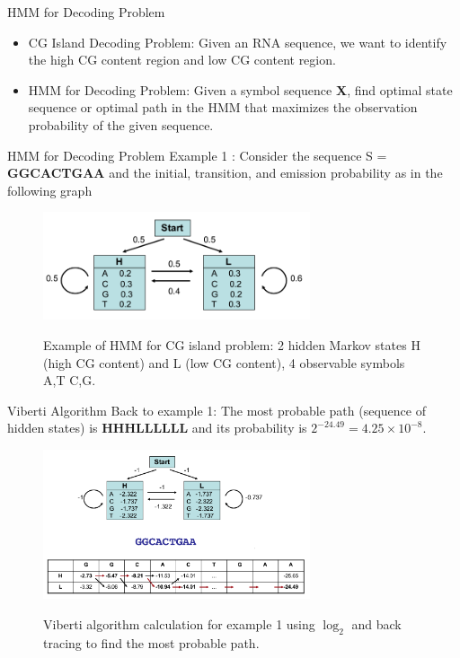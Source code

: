 \documentclass{beamer}
\begin{document}
\begin{frame}{HMM for Decoding Problem}
	\begin{itemize}
		\item CG Island Decoding Problem: Given an RNA sequence, we want to identify the high CG content region and low CG content region.
		\item HMM for Decoding Problem: Given a symbol sequence \textbf{X}, find optimal state sequence or optimal path in the HMM that maximizes the observation probability of the given sequence.
	\end{itemize}
\end{frame}

\begin{frame}{HMM for Decoding Problem}
	Example 1 \cite{borodovsky2006problems}: Consider the sequence S = \textbf{GGCACTGAA} and the initial, transition, and emission probability as in the following graph
	\begin{figure}
		\centering
		\includegraphics[width = 0.7\textwidth]{example1.png}
		\label{fig:example1}
		\caption{Example of HMM for CG island problem: 2 hidden Markov states H (high CG content) and L (low CG content), 4 observable symbols A,T C,G.}
	\end{figure}
\end{frame} 

\begin{frame}{Viberti Algorithm}
	Back to example 1: The most probable path (sequence of hidden states) is \textbf{HHHLLLLLL} and its probability is $2^{-24.49} = 4.25 \times 10^{-8}$.
	\begin{figure}
		\centering
		\includegraphics[width = 0.7\textwidth]{example1cal.png}
		\label{fig:example2cal}
		\caption{Viberti algorithm calculation for example 1 using $\log_2$ and back tracing to find the most probable path.}
	\end{figure}
\end{frame}
\end{document}
